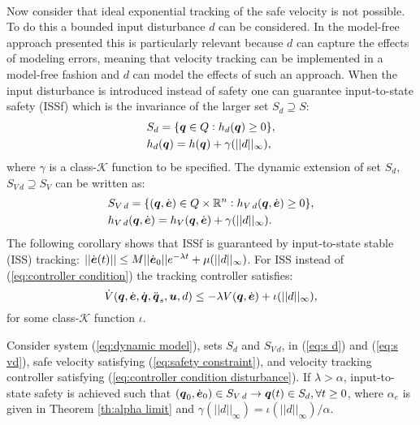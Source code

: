 \\
Now consider that ideal exponential tracking of the safe velocity is not possible. To do this a bounded input disturbance $d$ can be considered. In the model-free approach presented this is particularly relevant because $d$ can capture the effects of modeling errors, meaning that velocity tracking can be implemented in a model-free fashion and $d$ can model the effects of such an approach. When the input disturbance is introduced instead of safety one can guarantee input-to-state safety (ISSf) which is the invariance of the larger set $S_d \supseteq S$:
\begin{equation} \label{eq:s d}
    \begin{split}
        &S_d = \{{\boldsymbol{q}} \in Q: h_d({\boldsymbol{q}})\geq 0 \},\\
        &h_d({\boldsymbol{q}})=h({\boldsymbol{q}}) + \gamma(||d||_\infty  ),
    \end{split}
\end{equation}
where $\gamma$ is a class-$\mathcal{K}$ function to be specified. The dynamic extension of set $S_d$, $S_{V\,d}\supseteq S_V$ can be written as:
\begin{equation} \label{eq:s vd}
    \begin{split}
        &S_{V\,d} = \{({\boldsymbol{q}},\dot{\boldsymbol{e}})\in Q \times \mathbb{R}^n: h_{V\,d}({\boldsymbol{q}},\dot{\boldsymbol{e}})\geq 0\},\\
        &h_{V\,d}({\boldsymbol{q}},\dot{\boldsymbol{e}}) = h_V({\boldsymbol{q}},\dot{\boldsymbol{e}})+\gamma(||d||_\infty).
    \end{split}
\end{equation}
The following corollary shows that ISSf is guaranteed by input-to-state stable (ISS) tracking: $||\dot{\boldsymbol{e}}(t)|| \leq M ||\dot{\boldsymbol{e}}_0|| e^{-\lambda t}+\mu(||d||_\infty)$. For ISS instead of (\ref{eq:controller condition}) the tracking controller satisfies:
\begin{equation} \label{eq:controller condition disturbance}
    \dot{V}({\boldsymbol{q}},\dot{\boldsymbol{e}},\dot{{\boldsymbol{q}}},\ddot{{\boldsymbol{q}}}_s,\boldsymbol{u},d) \leq -\lambda V({\boldsymbol{q}},\dot{\boldsymbol{e}}) + \iota(||d||_{\infty}),
\end{equation}
for some class-$\mathcal{K}$ function $\iota$.
\begin{theorem}
    Consider system (\ref{eq:dynamic model}), sets $S_d$ and $S_{V\,d}$, in (\ref{eq:s d}) and (\ref{eq:s vd}), safe velocity satisfying (\ref{eq:safety constraint}), and velocity tracking controller satisfying (\ref{eq:controller condition disturbance}). If $\lambda > \alpha$, input-to-state safety is achieved such that $({\boldsymbol{q}}_0,\dot{\boldsymbol{e}}_0) \in S_{V\,d} \rightarrow {\boldsymbol{q}}(t) \in S_d, \forall t \geq 0$, where $\alpha_e$ is given in Theorem \ref{th:alpha limit} and $\gamma(||d||_\infty)=\iota(||d||_\infty)/\alpha$.
\end{theorem}
